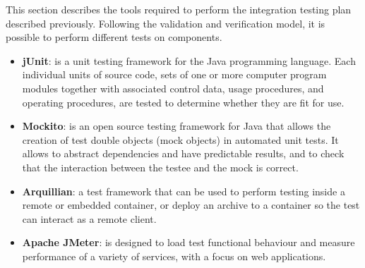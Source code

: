 This section describes the tools required to perform the integration testing plan described previously.
Following the validation and verification model, it is possible to perform different tests on components.

\begin{itemize}
	\item \textbf{jUnit}: is a unit testing framework for the Java programming language. Each individual units of source code, sets of one or more computer program modules together with associated control data, usage procedures, and operating procedures, are tested to determine whether they are fit for use.
	\item \textbf{Mockito}: is an open source testing framework for Java that allows the creation of test double objects (mock objects) in automated unit tests. It allows to abstract dependencies and have predictable results, and to check that the interaction between the testee and the mock is correct. 
	\item \textbf{Arquillian}: a test framework that can be used to perform testing inside a remote or embedded container, or deploy an archive to a container so the test can interact as a remote client.
	\item \textbf{Apache JMeter}: is designed to load test functional behaviour and measure performance of a variety of services, with a focus on web applications.
\end{itemize}